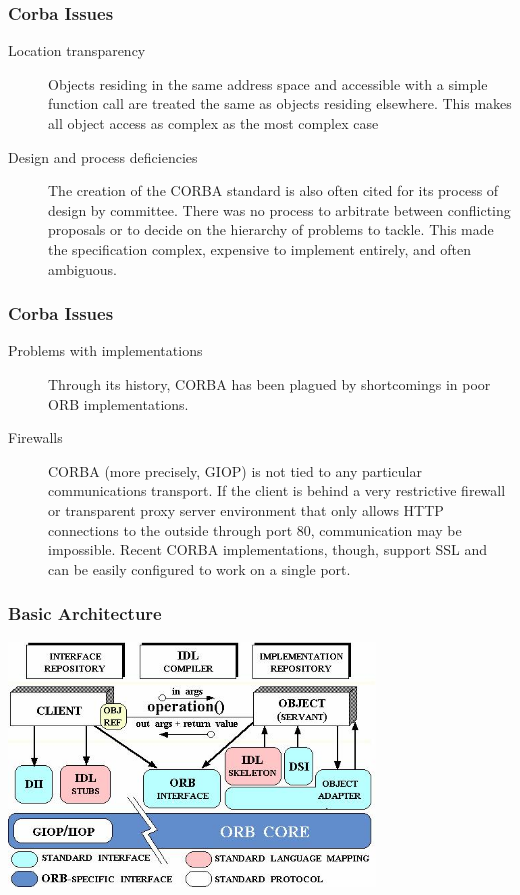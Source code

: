 \documentclass{beamer}
\begin{document}
 
     \begin{frame}
     	\frametitle{Corba Issues}
     	\begin{description}
     		\item[Location transparency]
     		Objects residing in the same address space and accessible with a simple function call are treated the same as objects residing elsewhere. This makes all object access as complex as the most complex case
     		
     		\item[Design and process deficiencies]
     		The creation of the CORBA standard is also often cited for its process of design by committee. There was no process to arbitrate between conflicting proposals or to decide on the hierarchy of problems to tackle. This made the specification complex, expensive to implement entirely, and often ambiguous.
     		
     	
     		
     	\end{description}
     
     \end{frame}
     \begin{frame}
     	\frametitle{Corba Issues}
     	\begin{description}	
     		\item[Problems with implementations]
     		Through its history, CORBA has been plagued by shortcomings in poor ORB implementations. 
     		\item[Firewalls]
     		CORBA (more precisely, GIOP) is not tied to any particular communications transport. 
     		If the client is behind a very restrictive firewall or transparent proxy server environment that only allows HTTP connections to the outside through port 80, communication may be impossible.
     		Recent CORBA implementations, though, support SSL and can be easily configured to work on a single port.
     		
     	\end{description}
     	
     \end{frame} 
 
    \begin{frame}
    	\frametitle{Basic Architecture}
    	\includegraphics[height=6.5cm]{corbaArchitecture.jpeg}
    \end{frame}
       
\end{document}
